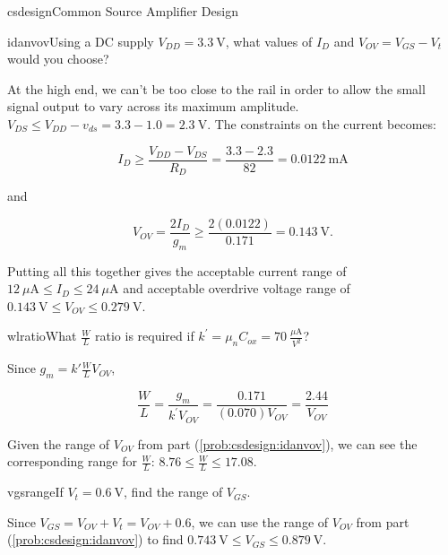 \begin{mainquestion}{csdesign}{Common Source Amplifier Design}
\begin{partquestion}{idanvov}{Using a DC supply $V_{DD} = 3.3\ \text{V}$, what values of $I_{D}$ and $V_{OV} = V_{GS} - V_{t}$ would you choose?}
\begin{answer}
At the high end, we can't be too close to the rail in order to allow the small signal output to vary across its maximum amplitude. $V_{DS} \leq V_{DD} - v_{ds} = 3.3 - 1.0 = 2.3\ \text{V}$. The constraints on the current becomes:

\[
I_{D} \geq \frac{V_{DD} - V_{DS}}{R_{D}} = \frac{3.3 - 2.3}{82} = 0.0122\ \text{mA}
\]

and

\[
V_{OV} = \frac{2I_{D}}{g_{m}} \geq \frac{2(0.0122)}{0.171} = 0.143\ \text{V}.
\]

Putting all this together gives the acceptable current range of $12\ \mu\text{A} \leq I_{D} \leq 24\ \mu\text{A}$ and acceptable overdrive voltage range of $0.143\ \text{V} \leq V_{OV} \leq 0.279\ \text{V}$.
\end{answer}
\end{partquestion}

\begin{partquestion}{wlratio}{What $\frac{W}{L}$ ratio is required if $k^{\prime} = \mu_{n} C_{ox} = 70\ \frac{\mu\text{A}}{V^{2}}$?}
\begin{answer}
Since $g_{m} = k'\frac{W}{L}V_{OV}$,

\[
\frac{W}{L} = \frac{g_{m}}{k^{\prime} V_{OV}} = \frac{0.171}{(0.070)V_{OV}} = \frac{2.44}{V_{OV}}
\]

Given the range of $V_{OV}$ from part (\cref{prob:csdesign:idanvov}), we can see the corresponding range for $\frac{W}{L}$: $8.76 \leq \frac{W}{L} \leq 17.08$.
\end{answer}
\end{partquestion}

\begin{partquestion}{vgsrange}{If $V_{t} = 0.6\ \text{V}$, find the range of $V_{GS}$.}
\begin{answer}
Since $V_{GS} = V_{OV} + V_{t} = V_{OV} + 0.6$, we can use the range of $V_{OV}$ from part (\cref{prob:csdesign:idanvov}) to find $0.743\ \text{V} \leq V_{GS} \leq 0.879\ \text{V}$.
\end{answer}
\end{partquestion}

\end{mainquestion}

